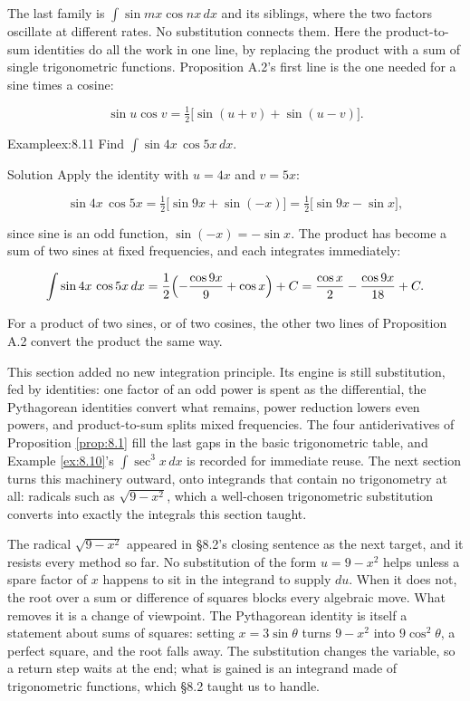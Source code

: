\documentclass[a4paper,12pt,oneside]{memoir}
\begin{document}
The last family is \(\int\sin mx\cos nx\,dx\) and its siblings, where the two factors oscillate at different rates. No substitution connects them. Here the product-to-sum identities do all the work in one line, by replacing the product with a sum of single trigonometric functions. Proposition A.2’s first line is the one needed for a sine times a cosine:

\[ \sin u\cos v = \tfrac{1}{2}\bigl[\sin(u + v) + \sin(u - v)\bigr]. \]

\begin{workedexample}
\begin{envexample}{Example}{ex:8.11}{}
Find \(\displaystyle\int \sin 4x\,\cos 5x\,dx\).
\end{envexample}
\begin{envsolution}{Solution}{}{}
Apply the identity with \(u = 4x\) and \(v = 5x\):

\[ \sin 4x\,\cos 5x = \tfrac{1}{2}\bigl[\sin 9x + \sin(-x)\bigr] = \tfrac{1}{2}\bigl[\sin 9x - \sin x\bigr], \]

since sine is an odd function, \(\sin(-x) = -\sin x\). The product has become a sum of two sines at fixed frequencies, and each integrates immediately:

\[ \int \sin 4x\,\cos 5x\,dx = \frac{1}{2}\Bigl(-\frac{\cos 9x}{9} + \cos x\Bigr) + C = \frac{\cos x}{2} - \frac{\cos 9x}{18} + C. \]

For a product of two sines, or of two cosines, the other two lines of Proposition A.2 convert the product the same way. \qedmark
\end{envsolution}
\end{workedexample}
This section added no new integration principle. Its engine is still substitution, fed by identities: one factor of an odd power is spent as the differential, the Pythagorean identities convert what remains, power reduction lowers even powers, and product-to-sum splits mixed frequencies. The four antiderivatives of Proposition \ref{prop:8.1} fill the last gaps in the basic trigonometric table, and Example \ref{ex:8.10}’s \(\int\sec^{3}x\,dx\) is recorded for immediate reuse. The next section turns this machinery outward, onto integrands that contain no trigonometry at all: radicals such as \(\sqrt{9 - x^{2}}\), which a well-chosen trigonometric substitution converts into exactly the integrals this section taught.


The radical \(\sqrt{9 - x^{2}}\) appeared in §8.2’s closing sentence as the next target, and it resists every method so far. No substitution of the form \(u = 9 - x^{2}\) helps unless a spare factor of \(x\) happens to sit in the integrand to supply \(du\). When it does not, the root over a sum or difference of squares blocks every algebraic move. What removes it is a change of viewpoint. The Pythagorean identity is itself a statement about sums of squares: setting \(x = 3\sin\theta\) turns \(9 - x^{2}\) into \(9\cos^{2}\theta\), a perfect square, and the root falls away. The substitution changes the variable, so a return step waits at the end; what is gained is an integrand made of trigonometric functions, which §8.2 taught us to handle.
\end{document}
